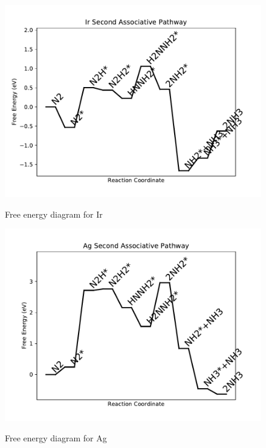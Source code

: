 \documentclass{article}
\begin{document}
\newpage
\begin{figure}
\includegraphics[width=1\linewidth]{data/plots/Ir_associative_2.pdf}
\label{fig:Ir_associative_2}
\caption{Free energy diagram for Ir}
\end{figure}

\begin{figure}
\includegraphics[width=1\linewidth]{data/plots/Ag_associative_2.pdf}
\label{fig:Ag_associative_2}
\caption{Free energy diagram for Ag}
\end{figure}
\end{document}
